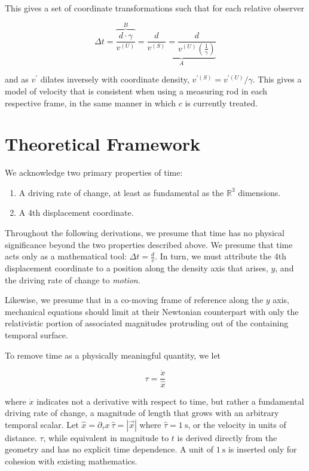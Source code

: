 \documentclass[pdflatex,sn-mathphys-num]{sn-jnl}%
\theoremstyle{thmstyleone}%
\theoremstyle{thmstyletwo}%
\theoremstyle{thmstylethree}%
\begin{document}
This gives a set of coordinate transformations such that for each relative observer

\begin{equation}
    \Delta t = \overbrace{\frac{d \cdot \gamma}{v^{\left( U \right)}}}^{B} = \underbrace{\frac{d}{v^{\left( S \right)}} = \frac{d}{v^{\left( U \right)} \left( \frac{1}{\gamma} \right)}}_{A}
\end{equation}

and as $v^{\prime}$ dilates inversely with coordinate density, $v^{\prime \left( S \right)} = v^{\prime \left( U \right)} / \gamma$. This gives a model of velocity that is consistent when using a measuring rod in each respective frame, in the same manner in which $c$ is currently treated.

\section{Theoretical Framework}\label{sec_theoretical_framework}

We acknowledge two primary properties of time:

\begin{enumerate}[1.]
\item A driving rate of change, at least as fundamental as the $\mathbb{R}^{3}$ dimensions.
\item A 4th displacement coordinate.
\end{enumerate}

Throughout the following derivations, we presume that time has no physical significance beyond the two properties described above. We presume that time acts only as a mathematical tool: $\Delta t = \frac{d}{v}$. In turn, we must attribute the 4th displacement coordinate to a position along the density axis that arises, $y$, and the driving rate of change to \textit{motion}.

Likewise, we presume that in a co-moving frame of reference along the $y$ axis, mechanical equations should limit at their Newtonian counterpart with only the relativistic portion of associated magnitudes protruding out of the containing temporal surface.


To remove time as a physically meaningful quantity, we let

\begin{equation}\label{eq_tau_definition}
\tau = \frac{\dot{x}}{\widehat{x}}
\end{equation}

where $\dot{x}$ indicates not a derivative with respect to time, but rather a fundamental driving rate of change, a magnitude of length that grows with an arbitrary temporal scalar. Let $\widehat{x} = \partial_\tau x\ \hat{\tau} = \left| \vec{x} \right|$ where $\hat{\tau} = 1~ \text{s}$, or the velocity in units of distance. $\tau$, while equivalent in magnitude to $t$ is derived directly from the geometry and has no explicit time dependence. A unit of $1~ \text{s}$ is inserted only for cohesion with existing mathematics.
\end{document}
